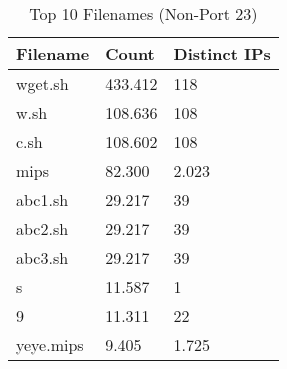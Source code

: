\begin{table}
\caption{Top 10 Filenames (Non-Port 23)}
\label{tab:top10_filenames_non_23}
\begin{tabular}{lll}
\toprule
Filename & Count & Distinct IPs \\
\midrule
wget.sh & 433.412 & 118 \\
w.sh & 108.636 & 108 \\
c.sh & 108.602 & 108 \\
mips & 82.300 & 2.023 \\
abc1.sh & 29.217 & 39 \\
abc2.sh & 29.217 & 39 \\
abc3.sh & 29.217 & 39 \\
s & 11.587 & 1 \\
9 & 11.311 & 22 \\
yeye.mips & 9.405 & 1.725 \\
\bottomrule
\end{tabular}
\end{table}
